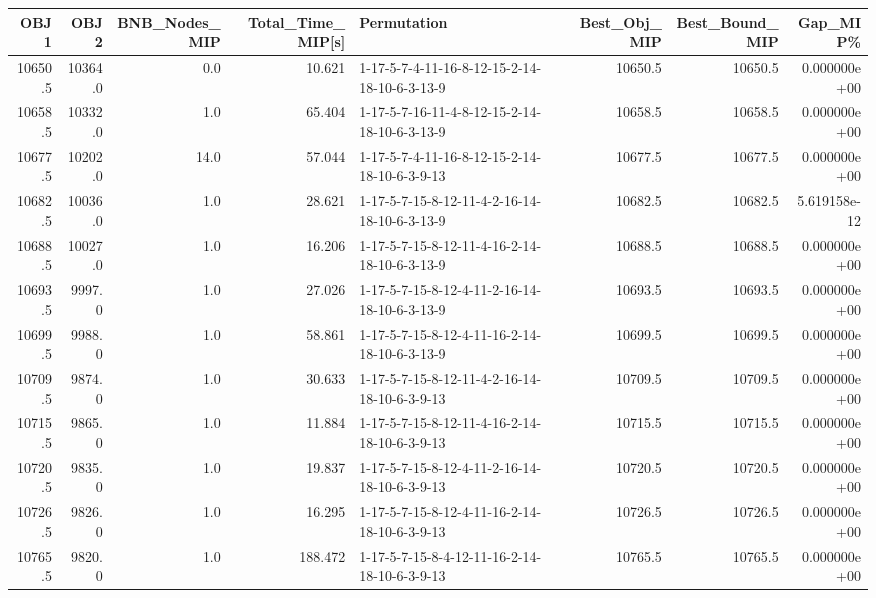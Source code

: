 \begin{tabular}{rrrrlrrr}
\toprule
    OBJ1 &     OBJ2 &  BNB\_Nodes\_MIP &  Total\_Time\_MIP[s] &                                   Permutation &  Best\_Obj\_MIP &  Best\_Bound\_MIP &      Gap\_MIP\% \\
\midrule
 10650.5 &  10364.0 &            0.0 &             10.621 &  1-17-5-7-4-11-16-8-12-15-2-14-18-10-6-3-13-9 &       10650.5 &         10650.5 &  0.000000e+00 \\
 10658.5 &  10332.0 &            1.0 &             65.404 &  1-17-5-7-16-11-4-8-12-15-2-14-18-10-6-3-13-9 &       10658.5 &         10658.5 &  0.000000e+00 \\
 10677.5 &  10202.0 &           14.0 &             57.044 &  1-17-5-7-4-11-16-8-12-15-2-14-18-10-6-3-9-13 &       10677.5 &         10677.5 &  0.000000e+00 \\
 10682.5 &  10036.0 &            1.0 &             28.621 &  1-17-5-7-15-8-12-11-4-2-16-14-18-10-6-3-13-9 &       10682.5 &         10682.5 &  5.619158e-12 \\
 10688.5 &  10027.0 &            1.0 &             16.206 &  1-17-5-7-15-8-12-11-4-16-2-14-18-10-6-3-13-9 &       10688.5 &         10688.5 &  0.000000e+00 \\
 10693.5 &   9997.0 &            1.0 &             27.026 &  1-17-5-7-15-8-12-4-11-2-16-14-18-10-6-3-13-9 &       10693.5 &         10693.5 &  0.000000e+00 \\
 10699.5 &   9988.0 &            1.0 &             58.861 &  1-17-5-7-15-8-12-4-11-16-2-14-18-10-6-3-13-9 &       10699.5 &         10699.5 &  0.000000e+00 \\
 10709.5 &   9874.0 &            1.0 &             30.633 &  1-17-5-7-15-8-12-11-4-2-16-14-18-10-6-3-9-13 &       10709.5 &         10709.5 &  0.000000e+00 \\
 10715.5 &   9865.0 &            1.0 &             11.884 &  1-17-5-7-15-8-12-11-4-16-2-14-18-10-6-3-9-13 &       10715.5 &         10715.5 &  0.000000e+00 \\
 10720.5 &   9835.0 &            1.0 &             19.837 &  1-17-5-7-15-8-12-4-11-2-16-14-18-10-6-3-9-13 &       10720.5 &         10720.5 &  0.000000e+00 \\
 10726.5 &   9826.0 &            1.0 &             16.295 &  1-17-5-7-15-8-12-4-11-16-2-14-18-10-6-3-9-13 &       10726.5 &         10726.5 &  0.000000e+00 \\
 10765.5 &   9820.0 &            1.0 &            188.472 &  1-17-5-7-15-8-4-12-11-16-2-14-18-10-6-3-9-13 &       10765.5 &         10765.5 &  0.000000e+00 \\

\end{tabular}
